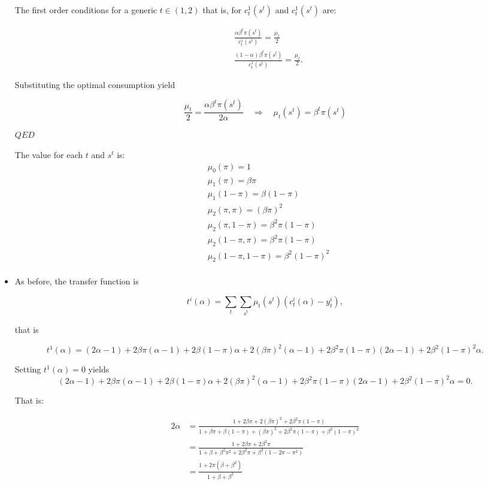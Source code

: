 \documentclass[12pt,a4paper]{article}
\begin{document}
\begin{itemize}
  The first order conditions for a generic $t \in (1, 2)$ that is, for $c_t^1(s^t)$ and $c_t^1(s^t)$ are:

  \begin{align*}
    & \frac{\alpha\beta^t \pi(s^t)}{c_t^1(s^t)} = \frac{\mu_t}{2} \\
    & \frac{(1 -\alpha)\beta^t \pi(s^t)}{c_t^1(s^t)} = \frac{\mu_t}{2}.
  \end{align*}

  Substituting the optimal consumption yield

  $$
    \frac{\mu_t}{2} = \frac{\alpha\beta^t \pi(s^t)}{ 2 \alpha} \quad \Rightarrow \quad \mu_t(s^t) = \beta^t \pi(s^t)
  $$

  $QED$

  The value for each $t$ and $s^t$ is:
  \begin{align*}
    & \mu_0(\pi)  = 1 \\
    & \mu_1(\pi)  = \beta \pi \\
    & \mu_1(1 - \pi)  = \beta (1 - \pi) \\
    & \mu_2(\pi, \pi)  = (\beta \pi)^2 \\
    & \mu_2(\pi, 1 - \pi)  = \beta^2 \pi (1 - \pi) \\
    & \mu_2(1 - \pi, \pi)  = \beta^2 \pi (1 - \pi) \\
    & \mu_2(1 - \pi, 1 - \pi)  = \beta^2 (1 - \pi)^2 \\
  \end{align*}

  \item As before, the transfer function is

    $$
      t^i(\alpha) = \sum_{t} \sum_{s^t} \mu_t(s^t) \left( c_t^i(\alpha)- y_t^i \right),
    $$

  that is

    $$
    t^1(\alpha) = (2\alpha - 1) + 2\beta \pi(\alpha - 1) + 2\beta (1 - \pi)\alpha + 2(\beta \pi)^2 (\alpha - 1) + 2 \beta^2 \pi (1 - \pi) (2 \alpha - 1) + 2 \beta^2 (1 - \pi)^2 \alpha.
    $$

  Setting  $t^1(\alpha)=0$ yields
  $$
  (2\alpha - 1) + 2\beta \pi(\alpha - 1) + 2\beta (1 - \pi)\alpha + 2(\beta \pi)^2 (\alpha - 1) + 2 \beta^2 \pi (1 - \pi) (2 \alpha - 1) + 2 \beta^2 (1 - \pi)^2 \alpha = 0.
  $$

  That is:

  \begin{align*}
    2 \alpha & = \frac{1 + 2\beta\pi + 2 (\beta\pi)^2 + 2\beta^2\pi(1-\pi)}{1 + \beta\pi + \beta(1 - \pi) + (\beta\pi)^2 + 2 \beta^2\pi(1-\pi) + \beta^2 (1 - \pi)^2} \\
    & = \frac{1 + 2\beta\pi + 2\beta^2\pi }{1 + \beta + \beta^2\pi^2 + 2\beta^2 \pi + \beta^2(1-2\pi-\pi^2)} \\
    & = \frac{1 + 2\pi(\beta + \beta^2)}{1 + \beta + \beta^2}
  \end{align*}


\end{itemize}
\end{document}
